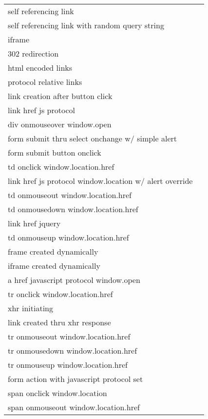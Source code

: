 \begin {longtable}{| p{} c |}
%
self referencing link										& \cmark \\
self referencing link with random query string				& \cmark \\
iframe														& \cmark \\
302 redirection												& \cmark \\
html encoded links											& \cmark \\
protocol relative links										& \cmark \\
link creation after button click							& \xmark \\
link href js protocol										& \xmark \\
div onmouseover window.open									& \cmark \\
form submit thru select onchange w/ simple alert			& \xmark \\
form submit button onclick									& \cmark \\
td onclick window.location.href								& \xmark \\
link href js protocol window.location w/ alert override		& \xmark \\
td onmouseout window.location.href							& \xmark \\
td onmousedown window.location.href							& \xmark \\
link href jquery											& \cmark \\
td onmouseup window.location.href							& \xmark \\
frame created dynamically									& \cmark \\
iframe created dynamically									& \cmark \\
a href javascript protocol window.open						& \xmark \\
tr onclick window.location.href								& \xmark \\
xhr initiating												& \cmark \\
link created thru xhr response								& \xmark \\
tr onmouseout window.location.href							& \xmark \\
tr onmousedown window.location.href							& \xmark \\
tr onmouseup window.location.href							& \xmark \\
form action with javascript protocol set					& \xmark \\
span onclick window.location								& \xmark \\
span onmouseout window.location.href						& \xmark \\

\end{longtable}

